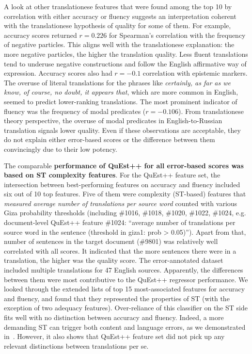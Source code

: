 \label{pg:errors_some_coherence_with_translationese_theory_of_quality}
A look at other translationese features that were found among the top 10 by correlation with either accuracy or fluency suggests an interpretation coherent with the translationese hypothesis of quality for some of them. 
For example, accuracy scores returned $r=0.226$ for Spearman's correlation with the frequency of negative particles. This aligns well with the translationese explanation: the more negative particles, the higher the translation quality. Less fluent translations tend to underuse negative constructions and follow the English affirmative way of expression. Accuracy scores also had $r=-0.1$ correlation with epistemic markers. The overuse of literal translations for the phrases like \textit{certainly, as far as we know, of course, no doubt, it appears that}, which are more common in English, seemed to predict lower-ranking translations. The most prominent indicator of fluency was the frequency of modal predicates ($r=-0.106$). From translationese theory perspective, the overuse of modal predicates in English-to-Russian translation signals lower quality.
Even if these observations are acceptable, they do not explain either error-based scores or the difference between them convincingly due to their low potency.   

\label{pg:quest_feats4err}
The comparable \textbf{performance of QuEst++ for all error-based scores was based on ST complexity features}.
For the QuEst++ feature set, the intersection between best-performing features on accuracy and fluency included six out of 10 top features. Five of them were complexity (ST-based) features that \textit{measured average number of translations per source word} counted with various Giza probability thresholds (including \#1016, \#1018, \#1020, \#1022, \#1024, e.g. document-level QuEst++ feature \#1024: ``average number of translations per source word in the sentence (threshold in giza1: prob > 0.05)''). Apart from that, number of sentences in the target document (\#9801) was relatively well correlated with all scores. It indicated that the more sentences there were in a translation, the higher was the quality score.
The error-annotated dataset included multiple translations for 47 English sources. Apparently, the differences between them were most contributive to the QuEst++ regressor performance. We looked through the extended lists of top 15 most-associated features for accuracy and fluency, and found that they represented the properties of ST (with the exception of two adequacy features). Over-reliance of this classifier on the ST side fits well with no distinction between accuracy and fluency. Indeed, a more demanding ST can trigger both content and language errors, as we demonstrated in~\cite{Kunilovskaya2022err}.
However, it also shows that QuEst++ feature set did not pick up any relevant distinctions between translations per se. 

